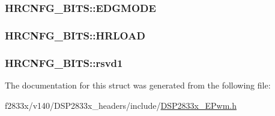 \subsubsection[{E\+D\+G\+M\+O\+D\+E}]{ H\+R\+C\+N\+F\+G\+\_\+\+B\+I\+T\+S\+::\+E\+D\+G\+M\+O\+D\+E}\label{struct_h_r_c_n_f_g___b_i_t_s_aafcb04b041a163e53a3f69cc7cfe9985}
\hypertarget{struct_h_r_c_n_f_g___b_i_t_s_a0d3a586f81f42dbc6e0058e589df79d8}{}
\subsubsection[{H\+R\+L\+O\+A\+D}]{ H\+R\+C\+N\+F\+G\+\_\+\+B\+I\+T\+S\+::\+H\+R\+L\+O\+A\+D}\label{struct_h_r_c_n_f_g___b_i_t_s_a0d3a586f81f42dbc6e0058e589df79d8}
\hypertarget{struct_h_r_c_n_f_g___b_i_t_s_ae9171039aace5808faba581f1dcd8a8e}{}
\subsubsection[{rsvd1}]{ H\+R\+C\+N\+F\+G\+\_\+\+B\+I\+T\+S\+::rsvd1}\label{struct_h_r_c_n_f_g___b_i_t_s_ae9171039aace5808faba581f1dcd8a8e}


The documentation for this struct was generated from the following file\+:\begin{DoxyCompactItemize}
\item 
f2833x/v140/\+D\+S\+P2833x\+\_\+headers/include/\hyperlink{_d_s_p2833x___e_pwm_8h}{D\+S\+P2833x\+\_\+\+E\+Pwm.\+h}\end{DoxyCompactItemize}
